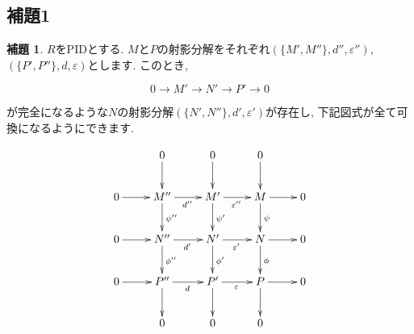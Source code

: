 \documentclass{jsarticle}
\theoremstyle{definition}
\newtheorem{lemma}{補題}
\numberwithin{theorem}{section}
\begin{document}
\subsection{補題1}
\begin{lemma}
$R$をPIDとする. $M$と$P$の射影分解をそれぞれ$(\{M', M''\}, d'', \varepsilon'')$, $(\{P', P''\}, d, \varepsilon)$とします.
このとき, 

\begin{equation*}
0\rightarrow M' \rightarrow N' \rightarrow P' \rightarrow 0
\end{equation*}

が完全になるような$N$の射影分解$(\{N', N''\}, d', \varepsilon')$が存在し, 下記図式が全て可換になるようにできます.

\begin{equation*}
\xymatrix{
            & 0 \ar[d] &  0 \ar[d] &  0 \ar[d] & \\
  0 \ar[r] & M'' \ar[r]_{d''} \ar[d]^{\psi''} & M' \ar[r]_{\varepsilon''} \ar[d]^{\psi'} & M \ar[r] \ar[d]^{\psi} & 0 \\
  0 \ar[r] & N'' \ar[r]_{d'} \ar[d]^{\phi''} & N' \ar[r]_{\varepsilon'} \ar[d]^{\phi'} & N \ar[r] \ar[d]^{\phi} & 0 \\
  0 \ar[r] & P'' \ar[r]_{d} \ar[d] & P' \ar[r]_{\varepsilon} \ar[d] & P \ar[r] \ar[d] & 0 \\
            & 0 &  0 &  0 & \\
}
\end{equation*}
\end{lemma}
\end{document}
